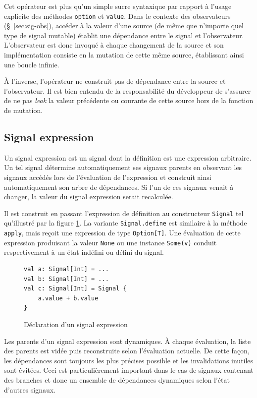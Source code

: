Cet opérateur est plus qu'un simple sucre syntaxique par rapport à l'usage explicite des méthodes \texttt{option} et \texttt{value}. Dans le contexte des observateurs (§~\ref{sec:sig-obs}), accéder à la valeur d'une source (de même que n'importe quel type de signal mutable) établit une dépendance entre le signal et l'observateur. L'observateur est donc invoqué à chaque changement de la source et son implémentation consiste en la mutation de cette même source, établissant ainsi une boucle infinie.

À l'inverse, l'opérateur \code{~=} ne construit pas de dépendance entre la source et l'observateur. Il est bien entendu de la responsabilité du développeur de s'assurer de ne pas \emph{leak} la valeur précédente ou courante de cette source hors de la fonction de mutation.

\subsection{Signal expression} \label{sec:sig-expr}

Un signal expression est un signal dont la définition est une expression arbitraire. Un tel signal détermine automatiquement ses signaux parents en observant les signaux accédés lors de l'évaluation de l'expression et construit ainsi automatiquement son arbre de dépendances. Si l'un de ces signaux venait à changer, la valeur du signal expression serait recalculée.

Il est construit en passant l'expression de définition au constructeur \texttt{Signal} tel qu'illustré par la figure \ref{fig:signal-expr-init}. La variante \texttt{Signal.define} est similaire à la méthode \texttt{apply}, mais reçoit une expression de type \texttt{Option[T]}. Une évaluation de cette expression produisant la valeur \texttt{None} ou une instance \texttt{Some(v)} conduit respectivement à un état indéfini ou défini du signal.

\begin{figure}[!h]
	\begin{lstlisting}
val a: Signal[Int] = ...
val b: Signal[Int] = ...
val c: Signal[Int] = Signal {
	a.value + b.value
}
	\end{lstlisting}
	\caption{Déclaration d'un signal expression}
	\label{fig:signal-expr-init}
\end{figure}

Les parents d'un signal expression sont dynamiques. À chaque évaluation, la liste des parents est vidée puis reconstruite selon l'évaluation actuelle. De cette façon, les dépendances sont toujours les plus précises possible et les invalidations inutiles sont évitées. Ceci est particulièrement important dans le cas de signaux contenant des branches et donc un ensemble de dépendances dynamiques selon l'état d'autres signaux.

